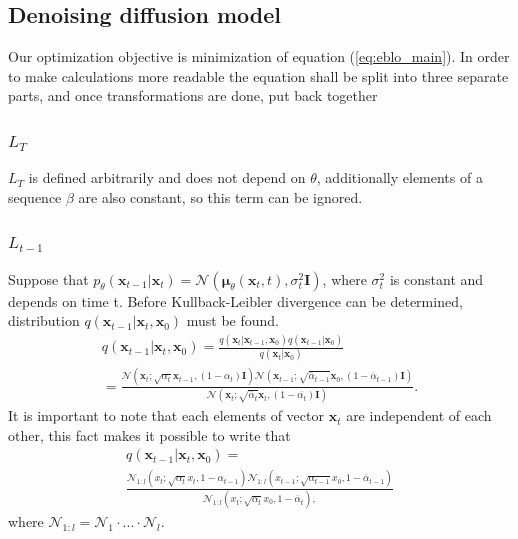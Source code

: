 \documentclass[10pt]{article}
\begin{document}
\subsection{Denoising diffusion model}
Our optimization objective is minimization of equation (\ref{eq:eblo_main}).
In order to make calculations more readable the equation shall be split into three separate parts, and once transformations are done, put back together 
\subsubsection{$L_T$}
$L_{T}$ is defined arbitrarily and does not depend on  $\theta$,
additionally elements of a sequence $\beta$ are also constant, so this term can be ignored. 
\subsubsection{$L_{t-1}$}
Suppose that
$p_{\theta}(\textbf{x}_{t-1} | \textbf{x}_{t}) = \mathcal{N}
(\bm{\mu}_{\theta}(\textbf{x}_{t}, t), \sigma^2_t \mathbf{I} )$, where $\sigma^2_t$ is constant and depends on time t. Before Kullback-Leibler divergence can be determined, distribution $q( \textbf{x}_{t-1}|  \textbf{x}_{t},  \textbf{x}_{0})$ must be found.
\begin{gather}
q( \textbf{x}_{t-1}|  \textbf{x}_{t},  \textbf{x}_{0}) =
\frac{q( \textbf{x}_{t}|  \textbf{x}_{t-1},  \textbf{x}_{0}) q( \textbf{x}_{t-1}|\textbf{x}_{0})}
{q( \textbf{x}_{t}|\textbf{x}_{0})} \\ 
= \frac{
    \mathcal{N}(\textbf{x}_{t}; \sqrt{\alpha_{t}} \textbf{x}_{t-1}, (1 - \alpha_{t})\mathbf{I}) 
    \mathcal{N}(\textbf{x}_{t-1}; \sqrt{\overline{\alpha}_{t-1}} \textbf{x}_{0}, (1 - \overline{\alpha}_{t-1})\mathbf{I})
    }{
     \mathcal{N}(\textbf{x}_{t}; \sqrt{\overline{\alpha}_{t}} \textbf{x}_{t}, (1 - \overline{\alpha_{t}})\mathbf{I})
    }.
\end{gather}
It is important to note that each elements of vector $\textbf{x}_{t}$ are independent of each other, this fact makes it possible to write that
\begin{gather}
q( \textbf{x}_{t-1}|  \textbf{x}_{t},  \textbf{x}_{0}) = \\
    \frac{
  \mathcal{N}_{1:l}(x_{t};\sqrt{\alpha_{t}} x_{t}, 1 - \alpha_{t-1}) 
  \mathcal{N}_{1:l}(x_{t-1};\sqrt{\alpha_{t-1}} x_{0}, 1 -  \overline{\alpha}_{t-1} ) 
  }{
    \mathcal{N}_{1:l}(x_{t};\sqrt{\alpha_{t}} x_{0}, 1 - \overline{\alpha}_{t}) ,
  }
\end{gather}
where $ \mathcal{N}_{1:l} = \mathcal{N}_{1} \cdot ... \cdot \mathcal{N}_{l} $.
\end{document}
